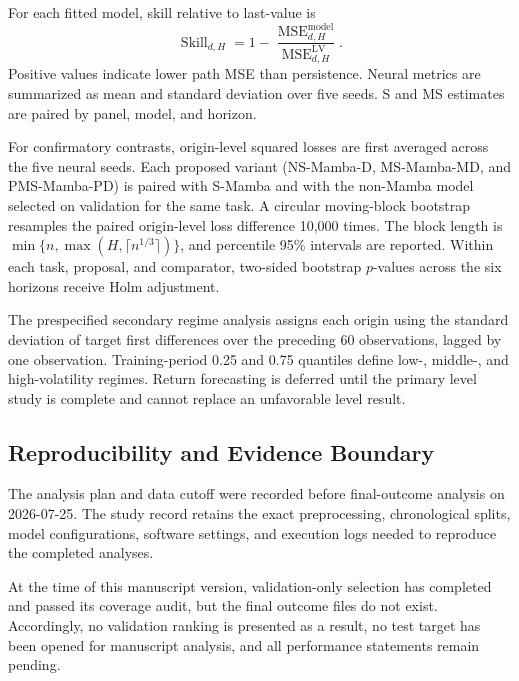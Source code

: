 For each fitted model, skill relative to last-value is
\begin{equation}
    \operatorname{Skill}_{d,H}=1-
    \frac{\operatorname{MSE}_{d,H}^{\mathrm{model}}}
         {\operatorname{MSE}_{d,H}^{\mathrm{LV}}}.
\end{equation}
Positive values indicate lower path MSE than persistence.
Neural metrics are summarized as mean and standard deviation over five seeds.
S and MS estimates are paired by panel, model, and horizon.

For confirmatory contrasts, origin-level squared losses are first averaged across the five neural seeds.
Each proposed variant (NS-Mamba-D, MS-Mamba-MD, and PMS-Mamba-PD) is paired with S-Mamba and with the non-Mamba model selected on validation for the same task.
A circular moving-block bootstrap resamples the paired origin-level loss difference 10,000 times.
The block length is $\min\{n,\max(H,\lceil n^{1/3}\rceil)\}$, and percentile 95\% intervals are reported.
Within each task, proposal, and comparator, two-sided bootstrap $p$-values across the six horizons receive Holm adjustment.

The prespecified secondary regime analysis assigns each origin using the standard deviation of target first differences over the preceding 60 observations, lagged by one observation.
Training-period 0.25 and 0.75 quantiles define low-, middle-, and high-volatility regimes.
Return forecasting is deferred until the primary level study is complete and cannot replace an unfavorable level result.

\subsection{Reproducibility and Evidence Boundary}

The analysis plan and data cutoff were recorded before final-outcome analysis on 2026-07-25.
The study record retains the exact preprocessing, chronological splits, model configurations, software settings, and execution logs needed to reproduce the completed analyses.

At the time of this manuscript version, validation-only selection has completed and passed its coverage audit, but the final outcome files do not exist.
Accordingly, no validation ranking is presented as a result, no test target has been opened for manuscript analysis, and all performance statements remain pending.
